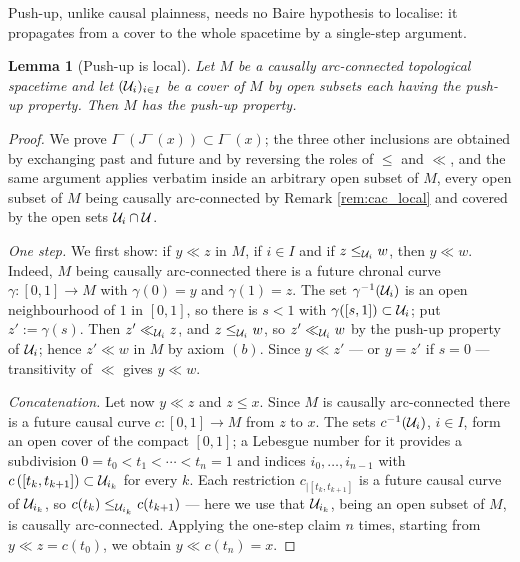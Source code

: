 \documentclass[a4paper,twoside]{article}
\newtheorem{lem}{Lemma}[section]
\begin{document}
Push-up, unlike causal plainness, needs no Baire hypothesis to localise: it propagates from a cover
to the whole spacetime by a single-step argument.

\begin{lem}[Push-up is local]\label{lem:pushup_local}
Let $M$ be a causally arc-connected topological spacetime and let $(\mathcal{U}_i)_{i\in I}$ be a cover of $M$
by open subsets each having the push-up property. Then $M$ has the push-up property.
\end{lem}
\begin{proof}
We prove $I^-\left(J^-(x)\right)\subset I^-(x)$; the three other inclusions are obtained by
exchanging past and future and by reversing the roles of $\leq$ and $\ll$, and the same argument
applies verbatim inside an arbitrary open subset of $M$, every open subset of $M$ being causally
arc-connected by Remark \ref{rem:cac_local} and covered by the open sets $\mathcal{U}_i\cap \mathcal{U}$.

\emph{One step.} We first show: if $y\ll z$ in $M$, if $i\in I$ and if $z\leq_{\mathcal{U}_i} w$, then
$y\ll w$. Indeed, $M$ being causally arc-connected there is a future chronal curve
$\gamma:[0,1]\rightarrow M$ with $\gamma(0)=y$ and $\gamma(1)=z$. The set $\gamma^{-1}(\mathcal{U}_i)$ is an
open neighbourhood of $1$ in $[0,1]$, so there is $s<1$ with $\gamma([s,1])\subset \mathcal{U}_i$; put
$z':=\gamma(s)$. Then $z'\ll_{\mathcal{U}_i} z$, and $z\leq_{\mathcal{U}_i}w$, so $z'\ll_{\mathcal{U}_i}w$ by the push-up
property of $\mathcal{U}_i$; hence $z'\ll w$ in $M$ by axiom $(b)$. Since $y\ll z'$ --- or $y=z'$ if $s=0$ ---
transitivity of $\ll$ gives $y\ll w$.

\emph{Concatenation.} Let now $y\ll z$ and $z\leq x$. Since $M$ is causally arc-connected there is a
future causal curve $c:[0,1]\rightarrow M$ from $z$ to $x$. The sets $c^{-1}(\mathcal{U}_i)$, $i\in I$, form
an open cover of the compact $[0,1]$; a Lebesgue number for it provides a subdivision
$0=t_0<t_1<\cdots<t_n=1$ and indices $i_0,\dots,i_{n-1}$ with $c\left([t_k,t_{k+1}]\right)\subset
\mathcal{U}_{i_k}$ for every $k$. Each restriction $c_{|[t_k,t_{k+1}]}$ is a future causal curve of
$\mathcal{U}_{i_k}$, so $c(t_k)\leq_{\mathcal{U}_{i_k}}c(t_{k+1})$ --- here we use that $\mathcal{U}_{i_k}$, being an open
subset of $M$, is causally arc-connected. Applying the one-step claim $n$ times, starting from
$y\ll z=c(t_0)$, we obtain $y\ll c(t_n)=x$.
\end{proof}
\end{document}
